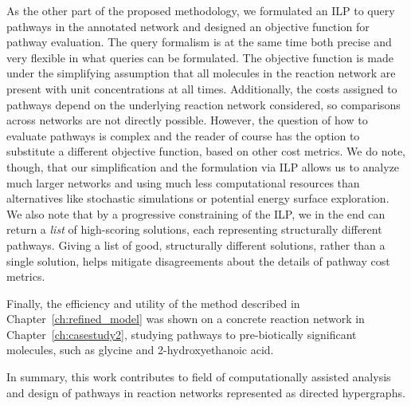 As the other part of the proposed methodology, we formulated an ILP to query pathways in the annotated network and designed an objective function
for pathway evaluation. The query formalism is at the same time both precise and very flexible in what queries can be formulated. The objective function is made under the simplifying assumption that all molecules in the reaction network are present with unit concentrations at all times. Additionally, the costs assigned to pathways depend on the underlying reaction network considered, so comparisons across networks are not directly possible. However, the question of how to evaluate pathways is complex and the reader of course has the option to substitute a different objective function, based on other cost metrics. We do note, though, that our simplification and the formulation via ILP allows us to analyze much larger networks and using much less computational resources than alternatives like stochastic simulations or potential energy surface exploration.
We also note that by a progressive constraining of the ILP, we in the end can return a \emph{list} of high-scoring solutions, each representing structurally different pathways. Giving a list of good, structurally different solutions, rather than a single solution, helps mitigate disagreements about the details of pathway cost metrics.

Finally, the efficiency and utility of the method described in Chapter~\ref{ch:refined_model} was shown on a concrete reaction network in Chapter~\ref{ch:casestudy2}, studying pathways to pre-biotically significant molecules, such as glycine and 2-hydroxyethanoic acid. 

In summary, this work contributes to field of computationally assisted analysis and design of pathways in reaction networks represented as directed hypergraphs.


